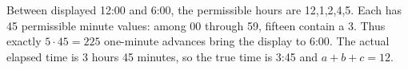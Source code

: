 Between displayed 12:00 and 6:00, the permissible hours are 12,1,2,4,5. Each has 45 permissible minute values: among 00 through 59, fifteen contain a 3. Thus exactly $5\cdot45=225$ one-minute advances bring the display to 6:00. The actual elapsed time is 3 hours 45 minutes, so the true time is 3:45 and $\boxed{a+b+c=12}$.
